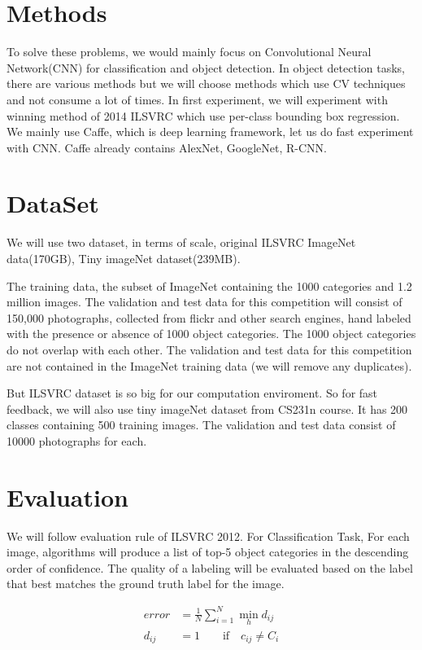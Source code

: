 \documentclass[10pt,twocolumn,letterpaper]{article}
\begin{document}
\section{Methods}

To solve these problems, we would mainly focus on Convolutional Neural Network(CNN) for classification and object detection.
In object detection tasks, there are various methods but we will choose methods which use CV techniques and not consume a lot of times.
In first experiment, we will experiment with winning method of 2014 ILSVRC which use per-class bounding box regression.
We mainly use Caffe, which is deep learning framework, let us do fast experiment with CNN.
Caffe already contains AlexNet, GoogleNet, R-CNN.

\section{DataSet}

We will use two dataset, in terms of scale, original ILSVRC ImageNet data(170GB), Tiny imageNet dataset(239MB).

The training data, the subset of ImageNet containing the 1000 categories and 1.2 million images.
The validation and test data for this competition will consist of 150,000 photographs, collected from flickr and other search engines, hand labeled with the presence or absence of 1000 object categories.
The 1000 object categories do not overlap with each other.
The validation and test data for this competition are not contained in the ImageNet training data (we will remove any duplicates).

But ILSVRC dataset is so big for our computation enviroment.
So for fast feedback, we will also use tiny imageNet dataset from CS231n course.
It has 200 classes containing 500 training images.
The validation and test data consist of 10000 photographs for each.

\section{Evaluation}

We will follow evaluation rule of ILSVRC 2012.
For Classification Task, For each image, algorithms will produce a list of top-5 object categories in the descending order of confidence.
The quality of a labeling will be evaluated based on the label that best matches the ground truth label for the image.

\begin{align*}
error &= \frac {1} {N} \sum_{i=1}^{N} {\min_{h} {d_{ij}}} \\
d_{ij} &= 1 \quad\quad \text{if}\quad c_{ij} \neq C_i \\
\end{align*}
\end{document}
